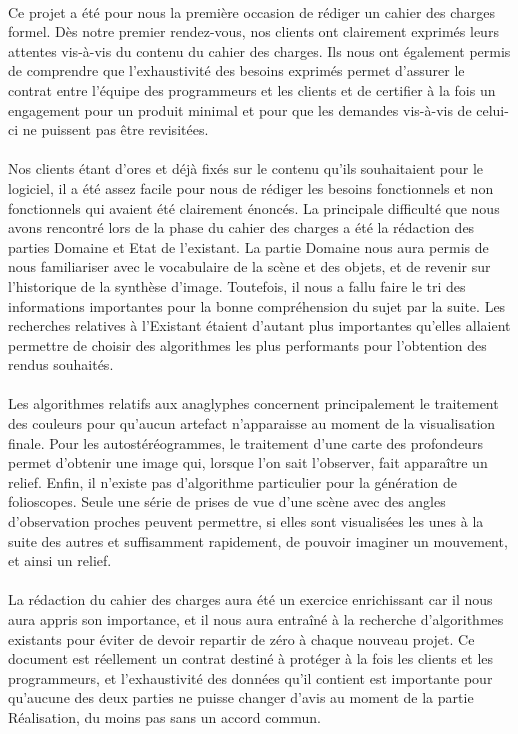 \paragraph{}
Ce projet a été pour nous la première occasion de rédiger un cahier des charges formel. Dès notre premier rendez-vous, nos clients ont clairement exprimés leurs attentes vis-à-vis du contenu du cahier des charges. Ils nous ont également permis de comprendre que l'exhaustivité des besoins exprimés permet d'assurer le contrat entre l'équipe des programmeurs et les clients et de certifier à la fois un engagement pour un produit minimal et pour que les demandes vis-à-vis de celui-ci ne puissent pas être revisitées.

\paragraph{}
Nos clients étant d'ores et déjà fixés sur le contenu qu'ils souhaitaient pour le logiciel, il a été assez facile pour nous de rédiger les besoins fonctionnels et non fonctionnels qui avaient été clairement énoncés. La principale difficulté que nous avons rencontré lors de la phase du cahier des charges a été la rédaction des parties Domaine et Etat de l'existant.
La partie Domaine nous aura permis de nous familiariser avec le vocabulaire de la scène et des objets, et de revenir sur l'historique de la synthèse d'image. Toutefois, il nous a fallu faire le tri des informations importantes pour la bonne compréhension du sujet par la suite.
Les recherches relatives à l'Existant étaient d'autant plus importantes qu'elles allaient permettre de choisir des algorithmes les plus performants pour l'obtention des rendus souhaités.

\paragraph{}
Les algorithmes relatifs aux anaglyphes concernent principalement le traitement des couleurs pour qu'aucun artefact n'apparaisse au moment de la visualisation finale. Pour les autostéréogrammes, le traitement d'une carte des profondeurs permet d'obtenir une image qui, lorsque l'on sait l'observer, fait apparaître un relief. Enfin, il n'existe pas d'algorithme particulier pour la génération de folioscopes. Seule une série de prises de vue d'une scène avec des angles d'observation proches peuvent permettre, si elles sont visualisées les unes à la suite des autres et suffisamment rapidement, de pouvoir imaginer un mouvement, et ainsi un relief.

\paragraph{}
La rédaction du cahier des charges aura été un exercice enrichissant car il nous aura appris son importance, et il nous aura entraîné à la recherche d'algorithmes existants pour éviter de devoir repartir de zéro à chaque nouveau projet. Ce document est réellement un contrat destiné à protéger à la fois les clients et les programmeurs, et l'exhaustivité des données qu'il contient est importante pour qu'aucune des deux parties ne puisse changer d'avis au moment de la partie Réalisation, du moins pas sans un accord commun.
